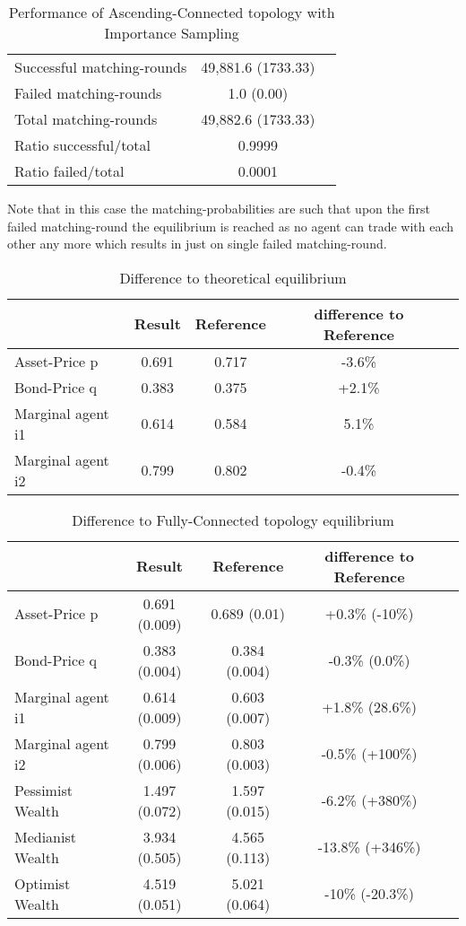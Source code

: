 \documentclass[Bachelorarbeit.tex]{subfiles}
\begin{document}
\begin{table}[H]
	\caption{Performance of Ascending-Connected topology with Importance Sampling}
	\centering
	\begin{tabular} { l c r }
		\hline
		Successful matching-rounds & 49,881.6 (1733.33) \\
		Failed matching-rounds & 1.0 (0.00) \\
		Total matching-rounds & 49,882.6 (1733.33) \\
		\hline
		Ratio successful/total & 0.9999 \\
		Ratio failed/total & 0.0001 \\
		\hline
	\end{tabular}
\end{table}

Note that in this case the matching-probabilities are such that upon the first failed matching-round the equilibrium is reached as no agent can trade with each other any more which results in just on single failed matching-round.

\begin{table}[H]
	\caption{Difference to theoretical equilibrium}
	\centering
	\begin{tabular} { l c c c r }
		& Result & Reference & difference to Reference \\
		\hline
		Asset-Price p & 0.691 & 0.717 & -3.6\% \\
		Bond-Price q & 0.383 & 0.375 & +2.1\% \\
		Marginal agent i1 & 0.614 & 0.584 & 5.1\% \\
		Marginal agent i2 & 0.799 & 0.802 & -0.4\% \\
		\hline
	\end{tabular}
\end{table}

\begin{table}[H]
	\caption{Difference to Fully-Connected topology equilibrium}
	\centering
	\begin{tabular} { l c c c r }
		& Result & Reference & difference to Reference \\
		\hline
		Asset-Price p & 0.691 (0.009) & 0.689 (0.01) & +0.3\% (-10\%) \\
		Bond-Price q & 0.383 (0.004) & 0.384 (0.004) & -0.3\% (0.0\%) \\
		Marginal agent i1 & 0.614 (0.009) & 0.603 (0.007) & +1.8\% (28.6\%) \\
		Marginal agent i2 & 0.799 (0.006) & 0.803 (0.003) & -0.5\% (+100\%) \\
		\hline
		Pessimist Wealth & 1.497 (0.072) & 1.597 (0.015) & -6.2\% (+380\%) \\
		Medianist Wealth & 3.934 (0.505) & 4.565 (0.113) & -13.8\% (+346\%) \\
		Optimist Wealth & 4.519 (0.051) & 5.021 (0.064) & -10\% (-20.3\%) \\
		\hline
	\end{tabular}
\end{table}
\end{document}
